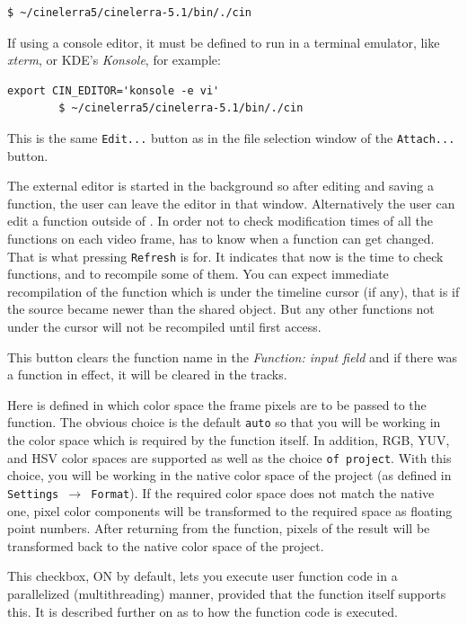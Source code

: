 \begin{description}
\begin{lstlisting}[style=sh]
		$ ~/cinelerra5/cinelerra-5.1/bin/./cin
	\end{lstlisting}
	If using a console editor, it must be defined to run in a terminal emulator, like \textit{xterm}, or KDE's \textit{Konsole}, for example:
	\begin{lstlisting}[style=sh]
		export CIN_EDITOR='konsole -e vi'
		$ ~/cinelerra5/cinelerra-5.1/bin/./cin
	\end{lstlisting}
	This is the same \texttt{Edit...} button as in the file selection window of the \texttt{Attach...} button.
	\item[Refresh] The external editor is started in the background so after editing and saving a function, the user can leave the editor in that window. Alternatively the user can edit a function outside of \CGG{}. In order not to check modification times of all the functions on each video frame, \CGG{} has to know when a function can get changed. That is what pressing \texttt{Refresh} is for. It indicates that now is the time to check functions, and to recompile some of them. You can expect immediate recompilation of the function which is under the timeline cursor (if any), that is if the source became newer than the shared object. But any other functions not under the cursor will not be recompiled until first access.
	\item[Detach] This button clears the function name in the \textit{Function: input field} and if there was a function in effect, it will be cleared in the tracks.
	\item[Color Space:] Here is defined in which color space the frame pixels are to be passed to the function.  The obvious choice is the default \texttt{auto} so that you will be working in the color space which is required by the function itself.  In addition, RGB, YUV, and HSV color spaces are supported as well as the choice \texttt{of project}. With this choice, you will be working in the native color space of the project (as defined in \texttt{Settings $\rightarrow$ Format}). If the required color space does not match the native one, pixel color components will be transformed to the required space as floating point numbers. After returning from the function, pixels of the result will be transformed back to the native color space of the project.
	\item[Parallelize processing] This checkbox, ON by default, lets you execute user function code in a parallelized (multithreading) manner, provided that the function itself supports this. It is described further on as to how the function code is executed.
\end{description}

